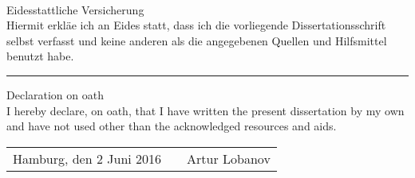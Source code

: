 \newpage 
%
%
%

\thispagestyle{empty}

\quad
\vfill
{\noindent
	{\Large
		\\
		Eidesstattliche Versicherung}
	\\
	\normalsize
	Hiermit erkl\"{a}e ich an Eides statt, dass ich die vorliegende Dissertationsschrift selbst verfasst und keine anderen als die angegebenen Quellen und Hilfsmittel benutzt habe.
	\\
	\rule{\linewidth}{1pt}
}
{\noindent
	{\large
		Declaration on oath}
	\\
	{\small
		I hereby declare, on oath, that I have written the present dissertation by my own and have not used other than the acknowledged resources and aids.}
}

\vspace{2\baselineskip}

\begin{table}[h!]
	\begin{tabular}{lcr}
		Hamburg, den 2 Juni 2016 \hfill &\hspace{0.4\textwidth} & Artur Lobanov \\

	\end{tabular}
\end{table}

